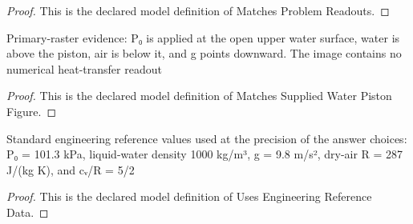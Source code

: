 \begin{proof}
  This is the declared model definition of Matches Problem Readouts.
\end{proof}
\begin{definition}
  \label{def:physics:phyx-mini-0457:phyxminiproblems-problemphyxmini0457-matchessuppliedwaterpistonfigure}
  Primary-raster evidence: P₀ is applied at the open upper water surface, water is above the piston, air is below it, and g points downward. The image contains no numerical heat-transfer readout
\end{definition}
\begin{proof}
  This is the declared model definition of Matches Supplied Water Piston Figure.
\end{proof}
\begin{definition}
  \label{def:physics:phyx-mini-0457:phyxminiproblems-problemphyxmini0457-usesengineeringreferencedata}
  Standard engineering reference values used at the precision of the answer choices: P₀ = 101.3 kPa, liquid-water density 1000 kg/m³, g = 9.8 m/s², dry-air R = 287 J/(kg K), and cᵥ/R = 5/2
\end{definition}
\begin{proof}
  This is the declared model definition of Uses Engineering Reference Data.
\end{proof}
